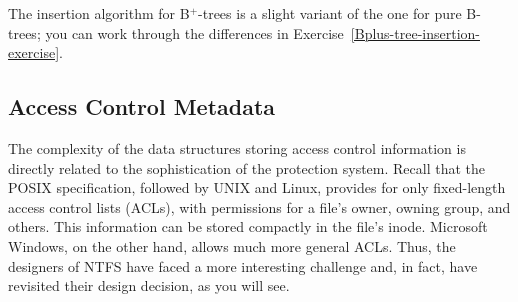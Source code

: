 The insertion algorithm for B${}^+$-trees is a slight variant of the
one for pure B-trees; you can work through the differences in
Exercise~\ref{Bplus-tree-insertion-exercise}.

\subsection{Access Control Metadata}\label{access-control-metadata-section}

The complexity of the data structures storing access control
information is directly related to the sophistication of the
protection system.  Recall that the POSIX specification, followed by
UNIX and Linux, provides for only fixed-length access control lists
(ACLs), with permissions for a file's owner, owning group, and
others.  This information can be stored compactly in the file's
inode.  Microsoft Windows, on the other hand, allows much more general
ACLs.  Thus, the designers of NTFS have faced a more interesting
challenge and, in fact, have revisited their design decision, as you
will see.

